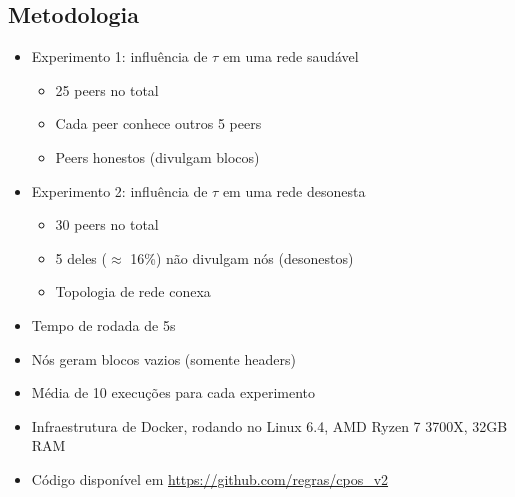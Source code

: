 \documentclass{beamer}
\begin{document}
\subsection{Metodologia}
\begin{frame}
\begin{itemize}
    \item Experimento 1: influência de $\tau$ em uma rede saudável
    \begin{itemize}
        \item 25 peers no total
        \item Cada peer conhece outros 5 peers
        \item Peers honestos (divulgam blocos)
    \end{itemize}
    \item Experimento 2: influência de $\tau$ em uma rede desonesta
    \begin{itemize}
        \item 30 peers no total
        \item 5 deles ($\approx$ 16\%) não divulgam nós (desonestos)
        \item Topologia de rede conexa
    \end{itemize}
\end{itemize}
\end{frame}

\begin{frame}
\begin{itemize}
    \item Tempo de rodada de 5s
    \item Nós geram blocos vazios (somente headers)
    \item Média de 10 execuções para cada experimento
    \item Infraestrutura de Docker, rodando no Linux 6.4, AMD Ryzen 7 3700X, 32GB RAM
    \item Código disponível em \url{https://github.com/regras/cpos_v2}
\end{itemize}
\end{frame}
\end{document}
